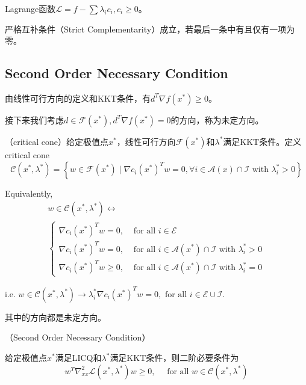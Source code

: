 Lagrange函数$\mathcal{L} = f - \sum \lambda_i c_i, c_i \ge 0$。

严格互补条件（Strict Complementarity）成立，若最后一条中有且仅有一项为零。

\subsection{Second Order Necessary Condition}

由线性可行方向的定义和KKT条件，有$d^{T} \nabla f\left(x^{*}\right) \ge 0$。

接下来我们考虑$d \in \mathcal{F}(x^{\ast}), d^{T} \nabla f\left(x^{*}\right) = 0$的方向，称为未定方向。

\begin{df}
  （critical cone）给定极值点$x^{\ast}$，线性可行方向$\mathcal{F}(x^{\ast})$和$\lambda^{\ast}$满足KKT条件。定义critical cone
  \[
    \mathcal{C}\left(x^{*}, \lambda^{*}\right)=\left\{w \in \mathcal{F}\left(x^{*}\right) \mid \nabla c_{i}\left(x^{*}\right)^{T} w=0\right. , \forall i \in \mathcal{A}(x) \cap \mathcal{I} \text{ with } \left.\lambda_{i}^{*}>0\right\} 
  \]
  
  Equivalently,
  \[
    \begin{array}{l}
      w \in \mathcal{C}\left(x^{*}, \lambda^{*}\right) \leftrightarrow \\
      \left\{\begin{array}{ll}
      \nabla c_{i}\left(x^{*}\right)^{T} w=0, & \text { for all } i \in \mathcal{E} \\
      \nabla c_{i}\left(x^{*}\right)^{T} w=0, & \text { for all } i \in \mathcal{A}\left(x^{*}\right) \cap \mathcal{I} \text { with } \lambda_{i}^{*}>0 \\
      \nabla c_{i}\left(x^{*}\right)^{T} w \geq 0, & \text { for all } i \in \mathcal{A}\left(x^{*}\right) \cap \mathcal{I} \text { with } \lambda_{i}^{*}=0
      \end{array}\right.
    \end{array}
  \]

  i.e. $w \in \mathcal{C}\left(x^{*}, \lambda^{*}\right) \rightarrow \lambda_{i}^{*} \nabla c_{i}\left(x^{*}\right)^{T} w=0, \text { for all } i \in \mathcal{E} \cup \mathcal{I}$.
\end{df}

其中的方向都是未定方向。

\begin{thm}（Second Order Necessary Condition）
  
  给定极值点$x^{\ast}$满足LICQ和$\lambda^{\ast}$满足KKT条件，则二阶必要条件为
  \[
    w^{T} \nabla_{x x}^{2} \mathcal{L}\left(x^{*}, \lambda^{*}\right) w \geq 0, \quad \text { for all } w \in \mathcal{C}\left(x^{*}, \lambda^{*}\right)
  \]
\end{thm}

